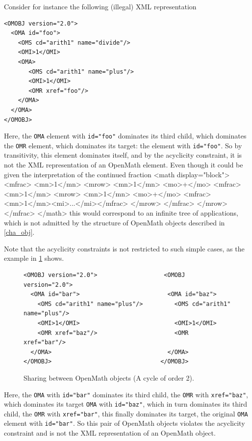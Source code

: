 \documentclass{report}
\def\OM{OpenMath\xspace}
\def\XML{XML\xspace}
\begin{document}
Consider for instance the following (illegal) \XML representation
\begin{lstlisting}
<OMOBJ version="2.0">
  <OMA id="foo">
    <OMS cd="arith1" name="divide"/>
    <OMI>1</OMI>
    <OMA>
       <OMS cd="arith1" name="plus"/>
       <OMI>1</OMI>
       <OMR xref="foo"/>
    </OMA> 
  </OMA>
</OMOBJ>
\end{lstlisting}

Here, the \lstinline|OMA| element with
\lstinline|id="foo"| dominates its third child, which dominates the
\lstinline|OMR| element, which dominates its target: the element with
\lstinline|id="foo"|. So by transitivity, this element dominates itself, and
by the acyclicity constraint, it is not the \XML representation of an \OM
element. Even though it could be given the interpretation of the continued fraction
<math display="block">
 <mfrac>
   <mn>1</mn>
   <mrow>
     <mn>1</mn>
     <mo>+</mo>
     <mfrac>
       <mn>1</mn>
       <mrow>
         <mn>1</mn>
         <mo>+</mo>
         <mfrac><mn>1</mn><mi>...</mi></mfrac>
       </mrow>
     </mfrac>
   </mrow>
 </mfrac>
</math> this would correspond to an infinite tree of applications,
which is not admitted by the structure of \OM objects described
in \ref{cha_obj}.


Note that the acyclicity constraints is not restricted
to such simple cases, as the example in \ref{fig_sharing_between}
shows.


\begin{figure}\centering
\caption{Sharing between \OM objects (A cycle of order 2).}\label{fig_sharing_between}
\begin{lstlisting}
<OMOBJ version="2.0">                   <OMOBJ version="2.0">
  <OMA id="bar">                         <OMA id="baz">
    <OMS cd="arith1" name="plus"/>         <OMS cd="arith1" name="plus"/>
    <OMI>1</OMI>                           <OMI>1</OMI>
    <OMR xref="baz"/>                      <OMR xref="bar"/>
  </OMA>                                 </OMA>
</OMOBJ>                               </OMOBJ>
\end{lstlisting}
\end{figure}

 Here, the \lstinline|OMA| with
\lstinline|id="bar"| dominates its third child, the
\lstinline|OMR| with \lstinline|xref="baz"|,
which dominates its target \lstinline|OMA| with
\lstinline|id="baz"|, which in turn dominates its third
child, the \lstinline|OMR| with
\lstinline|xref="bar"|, this finally dominates its
target, the original \lstinline|OMA| element with
\lstinline|id="bar"|. So this pair of \OM objects
violates the acyclicity constraint and is not the \XML
representation of an \OM object.
\end{document}
